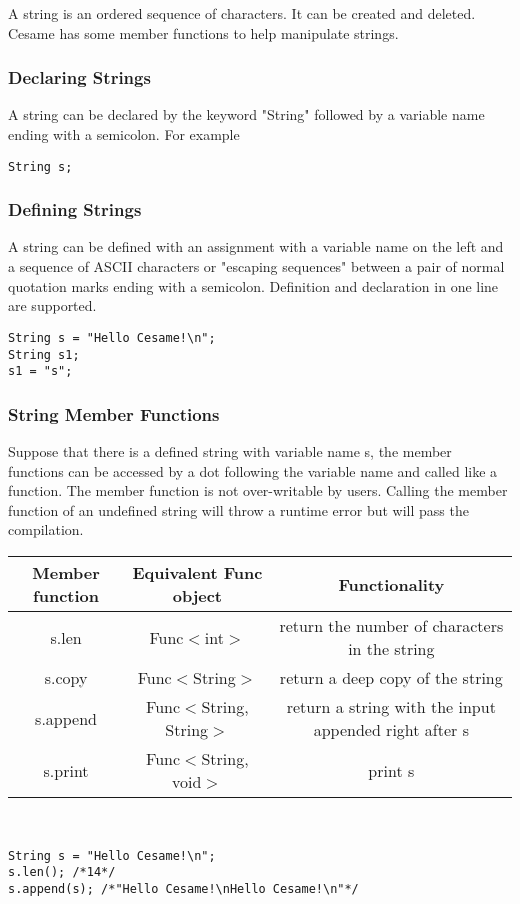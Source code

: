 A string is an ordered sequence of characters. It can be created and deleted. Cesame has some member functions to help manipulate strings.
\subsubsection{Declaring Strings}
A string can be declared by the keyword "String" followed by a variable name ending with a semicolon. For example
\begin{lstlisting}[caption={string\_declaration.csm}, captionpos=b]
String s;
\end{lstlisting}
\subsubsection{Defining Strings}
A string can be defined with an assignment with a variable name on the left and a sequence of ASCII characters or "escaping sequences" between a pair of normal quotation marks ending with a semicolon. Definition and declaration in one line are supported.
\begin{lstlisting}[caption={string\_definition.csm}, captionpos=b]
String s = "Hello Cesame!\n";
String s1;
s1 = "s";
\end{lstlisting}
\subsubsection{String Member Functions}
Suppose that there is a defined string with variable name s, the member functions can be accessed by a dot following the variable name and called like a function. The member function is not over-writable by users. Calling the member function of an undefined string will throw a runtime error but will pass the compilation.
\begin{table}[h]
    \centering
    \setlength{\arrayrulewidth}{0.3mm}
    \renewcommand{\arraystretch}{1.2}
    \begin{tabular}{ccc}
        \toprule
        Member function & Equivalent Func object & Functionality \\
        \midrule
        s.len & Func$<$int$>$ & return the number of characters in the string \\
        \arrayrulecolor{gray!50}\cmidrule(lr){1-3}\arrayrulecolor{black}
        s.copy & Func$<$String$>$ & return a deep copy of the string \\
        
        \arrayrulecolor{gray!50}\cmidrule(lr){1-3}\arrayrulecolor{black}
        s.append & Func$<$String, String$>$ & return a string with the input appended right after s \\
        \arrayrulecolor{gray!50}\cmidrule(lr){1-3}\arrayrulecolor{black}
        s.print & Func$<$String, void$>$ & print s \\
        \bottomrule
    \end{tabular}
\end{table}  \\
\begin{lstlisting}[caption={string\_member\_function.csm}, captionpos=b]
String s = "Hello Cesame!\n";
s.len(); /*14*/
s.append(s); /*"Hello Cesame!\nHello Cesame!\n"*/
\end{lstlisting}
